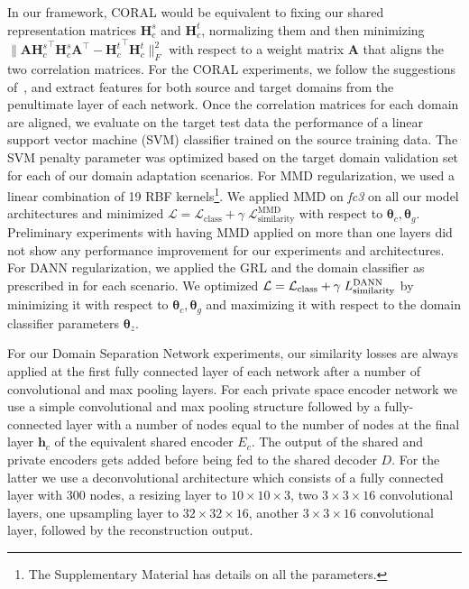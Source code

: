 \documentclass{article}
\newcommand{\bs}[1]{\boldsymbol{\mathbf{#1}}}
\begin{document}
 In our framework, CORAL \cite{sun2015return} would be equivalent to fixing our shared representation matrices $\bs H_c^s$ and $\bs H_c^t$, normalizing them and then minimizing $ \| \bs A{\bs H_c^s}^\top {\bs H_c^s}\bs A^\top - {\bs H_c^t}^\top {\bs H_c^t} \|_F^2$ with respect to a weight matrix $\bs A$ that aligns the two correlation matrices. For the {CORAL} experiments, we follow the suggestions of~\cite{sun2015return}, and extract features for both source and target domains from the penultimate layer of each network. Once the correlation matrices for each domain are aligned, we evaluate on the target test data the performance of a linear support vector machine (SVM) classifier trained on the source training data. The SVM penalty parameter was optimized based on the target domain validation set for each of our domain adaptation scenarios. 
For MMD regularization, we used a linear combination of 19 RBF kernels\footnote{The Supplementary Material has details on all the parameters.}. We applied MMD on \textsl{fc3} on all our model architectures and minimized
$\mathcal {L}=\mathcal {L}_\mathrm{class}+\gamma\; \mathcal {L}_\mathrm{similarity}^\mathrm{MMD}$ with respect to $\bs \theta_c,\bs \theta_g$.
Preliminary experiments with having MMD applied on more than one layers did not show any performance improvement for our experiments and architectures. 
For DANN regularization, we applied the GRL and the domain classifier as prescribed in \cite{ganin2016domain} for each scenario. We optimized
$\mathcal {L}=\mathcal {L}_\mathrm{class}+\gamma\; \mathcal\mathcal {L}_\mathrm{similarity}^\mathrm{DANN}$ by minimizing it with respect to $\bs \theta_c,\bs \theta_g$ and maximizing it with respect to the domain classifier parameters $\bs \theta_z$.

For our Domain Separation Network experiments, our similarity losses are always applied at the first fully connected layer of each network after a number of convolutional and max pooling layers. For each private space encoder network we use a simple convolutional and max pooling structure followed by a fully-connected layer with a number of nodes equal to the number of nodes at the final layer $\bs h_c$ of the equivalent shared encoder $E_c$. The output of the shared and private encoders gets added before being fed to the shared decoder $D$.
For the latter we use a deconvolutional architecture \cite{zeiler2010deconvolutional} which consists of a fully connected layer with 300 nodes, a resizing layer to $10\times10\times3$, two $3\times3\times16$ convolutional layers, one upsampling layer to $32\times32\times16$, another $3\times3\times16$ convolutional layer, followed by the reconstruction output.
\end{document}
